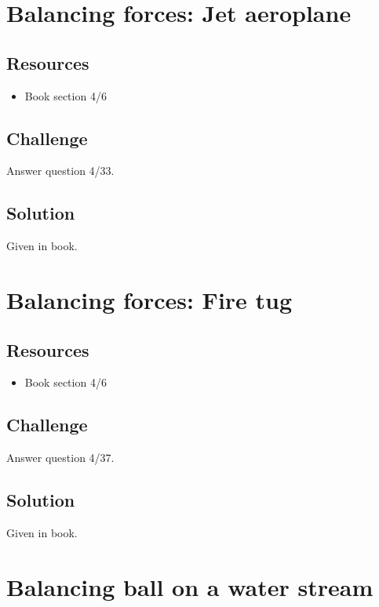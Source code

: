 \newpage
\section{Balancing forces: Jet aeroplane}

\subsection*{Resources}
\begin{itemize}
    \item Book section 4/6
\end{itemize}

\subsection*{Challenge}
Answer question 4/33.

\subsection*{Solution}
Given in book.



\newpage
\section{Balancing forces: Fire tug}

\subsection*{Resources}
\begin{itemize}
    \item Book section 4/6
\end{itemize}

\subsection*{Challenge}
Answer question 4/37.

\subsection*{Solution}
Given in book.




\iffalse
\newpage
\section{Balancing ball on a water stream}

